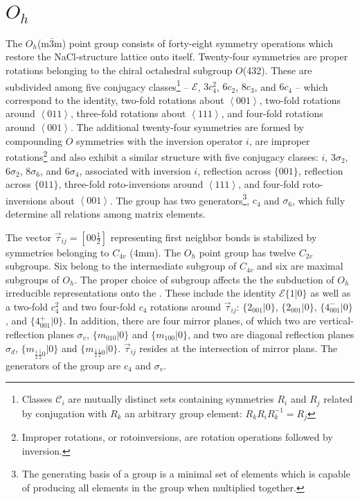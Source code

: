 \documentclass[twocolumn,showpacs,preprintnumbers,superscriptaddress,prb,floatfix,aps,10pt]{revtex4-1}
\newcommand*{\class}{\mathcal{C}}
\newcommand*{\id}{\mathcal{E}}
\newcommand*{\bondvec}{\vec{\tau}_{ij}}
\newcommand{\seitz}[2]{\{#1|#2\}}
\begin{document}
\section{$O_h$}
\label{appendix:pg}
The $O_h$(m$\bar{3}$m) point group consists of forty-eight symmetry operations which restore the NaCl-structure lattice onto itself. Twenty-four symmetries are proper rotations belonging to the chiral octahedral subgroup $O$(432). These are subdivided among five conjugacy classes\footnote{Classes $\class_i$ are mutually distinct sets containing symmetries $R_i$ and $R_j$ related by conjugation with $R_k$ an arbitrary group element: $R_kR_iR_k^{-1}=R_j$} --  $\id$, $3c_4^2$, $6c_2$, $8c_3$, and $6c_4$ -- which correspond to the identity, two-fold rotations about $\left<001\right>$, two-fold rotations around $\left<011\right>$, three-fold rotations about $\left<111\right>$, and four-fold rotations around $\left<001\right>$. The additional twenty-four symmetries are formed by compounding $O$ symmetries with the inversion operator $i$, are improper rotations\footnote{Improper rotations, or rotoinversions, are rotation operations followed by inversion.} and also exhibit a similar structure with five conjugacy classes: $i$, $3\sigma_2$, $6\sigma_2$, $8\sigma_6$, and $6\sigma_4$, associated with inversion $i$, reflection across $\{001\}$, reflection across $\{011\}$, three-fold roto-inversions around $\left<111\right>$, and four-fold roto-inversions about $\left<001\right>$. The group has two generators\footnote{The generating basis of a group is a minimal set of elements which is capable of producing all elements in the group when multiplied together.}, $c_4$ and $\sigma_6$, which fully determine all relations among matrix elements.

The vector $\bondvec = [00\frac{1}{2}]$ representing first neighbor bonds is stabilized by symmetries belonging to $C_{4v}$ (4mm). The $O_h$ point group has twelve $C_{2v}$ subgroups. Six belong to the intermediate subgroup of $C_{4v}$ and six are maximal subgroups of $O_h$.\cite{wadhawan_introduction_2000} The proper choice of subgroup affects the the subduction of $O_h$ irreducible representations onto the . 
These include the identity $\id \seitz{1}{0}$ as well as a two-fold $c_{4}^2$ and two four-fold $c_{4}$ rotations around $\bondvec$: $\seitz{2_{001}}{0}$, $\seitz{2_{001}}{0}$, $\seitz{4^-_{001}}{0}$, and $\seitz{4^+_{001}}{0}$. In addition, there are four mirror planes, of which two are vertical-reflection planes $\sigma_v$, $\seitz{m_{010}}{0}$ and $\seitz{m_{100}}{0}$, 
and two are diagonal reflection planes $\sigma_d$, $\seitz{m_{\frac{1}{2}\bar{\frac{1}{2}}0}}{0}$ and $\seitz{m_{\frac{1}{2}\frac{1}{2}0}}{0}$. $\bondvec$ resides at the intersection of mirror plans. The generators of the group are $c_4$ and $\sigma_v$.
\end{document}
